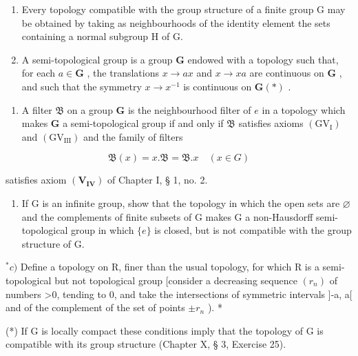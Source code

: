 \BourbakiExerciseGroup

\begin{enumerate}
\def\labelenumi{\arabic{enumi})}
\item
  Every topology compatible with the group structure of a finite group G may be obtained by taking as neighbourhoods of the identity element the sets containing a normal subgroup H of G.
\item
  A semi-topological group is a group \(\mathbf{G}\) endowed with a topology such that, for each \(a \in \mathbf{G}\) , the translations \(x \to ax\) and \(x \to xa\) are continuous on \(\mathbf{G}\) , and such that the symmetry \(x \to x^{-1}\) is continuous on \(\mathbf{G}(*)\) .
\end{enumerate}

\begin{enumerate}
\def\labelenumi{\alph{enumi})}
\tightlist
\item
  A filter \(\mathfrak{B}\) on a group \(\mathbf{G}\) is the neighbourhood filter of \(e\) in a topology which makes \(\mathbf{G}\) a semi-topological group if and only if \(\mathfrak{B}\) satisfies axioms \((\mathrm{GV}_{\mathrm{I}})\) and \((\mathrm{GV}_{\mathrm{III}})\) and the family of filters
\end{enumerate}

\[
\mathfrak {B} (x) = x. \mathfrak {B} = \mathfrak {B}. x \quad (x \in G)
\]

satisfies axiom \((\mathbf{V}_{\mathbf{IV}})\) of Chapter I, § 1, no. 2.

\begin{enumerate}
\def\labelenumi{\alph{enumi})}
\setcounter{enumi}{1}
\tightlist
\item
  If G is an infinite group, show that the topology in which the open sets are \(\varnothing\) and the complements of finite subsets of G makes G a non-Hausdorff semi-topological group in which \(\{e\}\) is closed, but is not compatible with the group structure of G.
\end{enumerate}

\(^{*}c)\) Define a topology on R, finer than the usual topology, for which R is a semi-topological but not topological group {[}consider a decreasing sequence \((r_{n})\) of numbers \textgreater0, tending to 0, and take the intersections of symmetric intervals {]}-a, a{[} and of the complement of the set of points \(\pm r_{n}\) ). *

(*) If G is locally compact these conditions imply that the topology of G is compatible with its group structure (Chapter X, § 3, Exercise 25).

